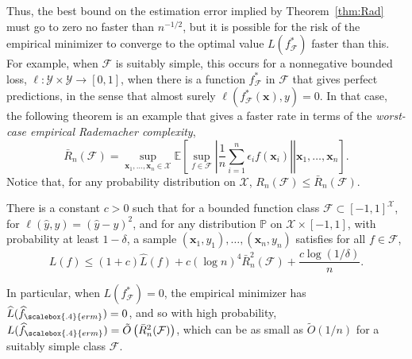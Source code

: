 Thus, the best bound on the estimation error implied by
Theorem~\ref{thm:Rad} must go to zero no faster than $n^{-1/2}$, but it is possible for the risk of the empirical minimizer to converge to the optimal value $L(f_{{\mathcal F}}^*)$ faster than this.  For example, when ${\mathcal F}$ is suitably simple, this occurs for a nonnegative bounded loss, $\ell:{\mathcal Y}\times{\mathcal Y}\to[0,1]$, when there is a function
$f_{{\mathcal F}}^*$ in ${\mathcal F}$ that gives perfect predictions, in the sense that almost surely $\ell(f_{{\mathcal F}}^*({\boldsymbol x}),y)=0$. In that case, the following theorem is an example that gives a faster rate in terms of the
{\em worst-case empirical Rademacher complexity},
      \[
        \bar R_n({\mathcal F}) = \sup_{{\boldsymbol x}_1,\ldots,{\boldsymbol x}_n\in{\mathcal X}}
          {\mathbb E}\left[\left.\sup_{f\in{\mathcal F}}
          \left|\frac{1}{n}\sum_{i=1}^n \epsilon_i
          f({\boldsymbol x}_i)\right|\right| {\boldsymbol x}_1,\ldots,{\boldsymbol x}_n\right].
      \]
Notice that, for any probability distribution on ${\mathcal X}$,
$R_n({\mathcal F})\le\bar R_n({\mathcal F})$.

\begin{theorem}\label{theorem:fastRad}
    There is a constant $c>0$ such that for a bounded function class
    ${\mathcal F}\subset [-1,1]^{\mathcal X}$, for $\ell(\widehat y,y)=(\widehat
    y-y)^2$, and for any distribution $\mathbb{P}$ on ${\mathcal X}\times[-1,1]$, with probability at least
    $1-\delta$, a sample $({\boldsymbol x}_1,y_1),\ldots,({\boldsymbol x}_n,y_n)$ satisfies for all $f\in {\mathcal F}$,
      \[
        L(f) \le (1+c)\widehat L(f) + c\left(\log n\right)^4
        \bar R_n^2({\mathcal F}) + \frac{c\log(1/\delta)}{n}.
      \]
  \end{theorem}

In particular, when $L(f_{{\mathcal F}}^*)=0$, the empirical minimizer has
$\widehat L(\widehat{f}_{\scalebox{.4}{erm}})=0$, and so with high probability, $L(\widehat{f}_{\scalebox{.4}{erm}}) = \tilde O\left(\bar R_n^2({\mathcal F})\right)$, which can be as small as $\tilde
O(1/n)$ for a suitably simple class ${\mathcal F}$.

